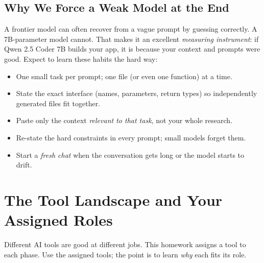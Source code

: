 \documentclass[11pt,a4paper]{article}
\begin{document}
\subsection{Why We Force a Weak Model at the End}
A frontier model can often recover from a vague prompt by guessing correctly. A 7B-parameter model cannot. That makes it an excellent \emph{measuring instrument}: if Qwen 2.5 Coder 7B builds your app, it is because your context and prompts were good. Expect to learn these habits the hard way:
\begin{itemize}
\item One small task per prompt; one file (or even one function) at a time.
\item State the exact interface (names, parameters, return types) so independently generated files fit together.
\item Paste only the context \emph{relevant to that task}, not your whole research.
\item Re-state the hard constraints in every prompt; small models forget them.
\item Start a \emph{fresh chat} when the conversation gets long or the model starts to drift.
\end{itemize}

\clearpage
\section{The Tool Landscape and Your Assigned Roles}
Different AI tools are good at different jobs. This homework assigns a tool to each phase. Use the assigned tools; the point is to learn \emph{why} each fits its role.
\end{document}

